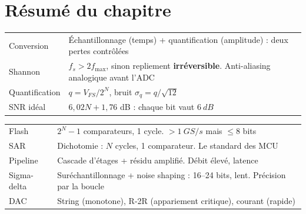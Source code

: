 \documentclass[12pt,a4paper,twoside]{book}
\begin{document}
\section*{Résumé du chapitre}

\begin{bases}[title={\color{white} Résumé --- Les Bases}]
\begin{center}
\renewcommand{\arraystretch}{1.3}
\begin{tabular}{p{3.5cm}p{9.5cm}}
\toprule
Conversion & Échantillonnage (temps) + quantification (amplitude) : deux pertes contrôlées \\
Shannon & $f_s > 2f_{\max}$, sinon repliement \textbf{irréversible}. Anti-aliasing analogique avant l'ADC \\
Quantification & $q = V_{FS}/2^N$, bruit $\sigma_q = q/\sqrt{12}$ \\
SNR idéal & $6{,}02N + 1{,}76$ dB : chaque bit vaut $\SI{6}{dB}$ \\
\bottomrule
\end{tabular}
\end{center}
\end{bases}

\begin{approfondissement}[title={\color{white} Résumé --- Approfondissement}]
\begin{center}
\renewcommand{\arraystretch}{1.3}
\begin{tabular}{p{3.5cm}p{9.5cm}}
\toprule
Flash & $2^N-1$ comparateurs, 1 cycle. $>\SI{1}{GS/s}$ mais $\leq 8$ bits \\
SAR & Dichotomie : $N$ cycles, 1 comparateur. Le standard des MCU \\
Pipeline & Cascade d'étages + résidu amplifié. Débit élevé, latence \\
Sigma-delta & Suréchantillonnage + noise shaping : 16--24 bits, lent. Précision par la boucle \\
DAC & String (monotone), R-2R (appariement critique), courant (rapide) \\
\bottomrule
\end{tabular}
\end{center}
\end{approfondissement}
\end{document}
